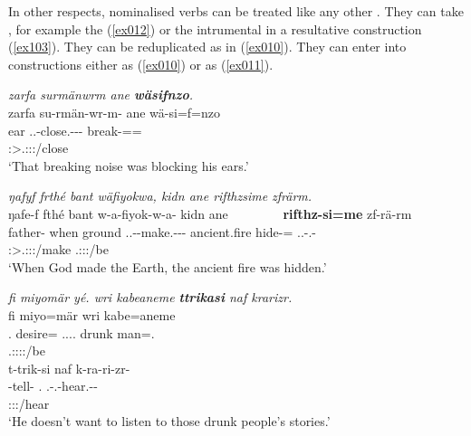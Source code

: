 In other respects, nominalised verbs can be treated like any other . They can take , for example the  (\ref{ex012}) or the intrumental in a resultative construction (\ref{ex103}). They can be reduplicated as in (\ref{ex010}). They can enter into  constructions either as  (\ref{ex010}) or as  (\ref{ex011}).

\begin{exe}
	\ex \textit{zarfa surmänwrm ane \textbf{wäsifnzo}.}\\
	\glll zarfa su-rmän-wr-m-\Zero{} ane wä-si=f=nzo\\
	ear \Tsg.\Masc.\Betatwo-close.\Ext-\Ndu-\Dur-\Stnsg{} \Dem{} break-\Nmlz{}=\Erg{}=\Only{}\\
	{} \footnotesize{\Stsg:\Sbj>\Tsg.\Masc:\Obj:\Pst:\Dur/close} {} {}\\
	\trans `That breaking noise was blocking his ears.' 
	\label{ex012}
\end{exe}
\begin{exe}
	\ex \emph{ŋafyf frthé bant wäfiyokwa, kidn ane rifthzsime zfrärm.}\\
	\glll ŋafe-f fthé bant w-a-fiyok-w-a-\Zero{} kidn ane~~~~~~~~  \textbf{rifthz-si=me} zf-rä-rm\\
	father-\Erg{} when ground \Tsg.\F.\Alph-\Vc-make.\Ext-\Ndu-\Pst-\Stsg{} ancient.fire \Dem{} hide-\Nmlz{}=\Ins{} \Tsg.\F.\Betatwo-\Cop.\Ndu-\Dur\\
	{} {} {} \footnotesize{\Stsg:\Sbj>\Tsg.\F:\Obj:\Pst:\Ipfv/make} {} {} {} \footnotesize{\Tsg.\F:\Sbj:\Pst:\Dur/be}\\
	\trans `When God made the Earth, the ancient fire was hidden.'\\ 
	\label{ex103}
\end{exe}
\begin{exe}
	\ex \textit{fi miyomär yé. wri kabeaneme \textbf{ttrikasi} naf krarizr.}\\
	\glll fi miyo=mär  wri kabe=aneme\\
	\Third{}.\Abs{} desire=\Priv{} \Tsg.\Masc.\Alph.\Cop.\Ndu{} drunk man=\Poss{}.\Nsg{}\\
	{} {} \footnotesize{\Tsg{}.\Masc{}:\Alph:\Sbj:\Nonpast:\Ipfv/be} {} {}\\
	\sn
	\glll t-trik-si naf k-ra-ri-zr-\Zero{}\\
	\Redup{}-tell-\Nmlz{} \Tsg{}.\Erg{} \M.\Bet-\Irr.\Vc-hear.\Ext-\Ndu-\Stsg{}\\
	{} {} \footnotesize{\Stsg:\Sbj:\Irr:\Ipfv/hear}\\
	\trans `He doesn't want to listen to those drunk people's stories.'\\ 
	\label{ex010}
\end{exe}
